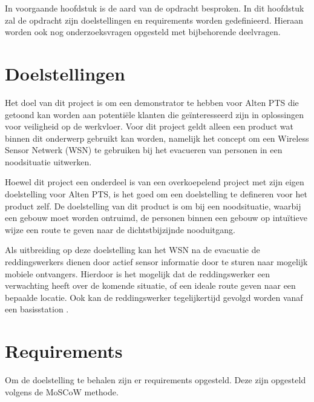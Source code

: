\documentclass{../local}
\begin{document}
In voorgaande hoofdstuk is de aard van de opdracht besproken. In dit hoofdstuk zal de opdracht zijn doelstellingen en requirements worden gedefinieerd. Hieraan worden ook nog onderzoeksvragen opgesteld met bijbehorende deelvragen.

\section{Doelstellingen}
Het doel van dit project is om een demonstrator te hebben voor Alten PTS die getoond kan worden aan potentiële klanten die geïnteresseerd zijn in oplossingen voor veiligheid op de werkvloer. Voor dit project geldt alleen een product wat binnen dit onderwerp gebruikt kan worden, namelijk het concept om een Wireless Sensor Netwerk (WSN) te gebruiken bij het evacueren van personen in een noodsituatie uitwerken.

Hoewel dit project een onderdeel is van een overkoepelend project met zijn eigen doelstelling voor Alten PTS, is het goed om een doelstelling te defineren voor het product zelf. De doelstelling van dit product is om bij een noodsituatie, waarbij een gebouw moet worden ontruimd, de personen binnen een gebouw op intuïtieve wijze een route te geven naar de dichtstbijzijnde nooduitgang. 

Als uitbreiding op deze doelstelling kan het WSN na de evacuatie de reddingswerkers dienen door actief sensor informatie door te sturen naar mogelijk mobiele ontvangers. Hierdoor is het mogelijk dat de reddingswerker een verwachting heeft over de komende situatie, of een ideale route geven naar een bepaalde locatie. Ook kan de reddingswerker tegelijkertijd gevolgd worden vanaf een basisstation \cite{ShaWSN}.

\section{Requirements}
Om de doelstelling te behalen zijn er requirements opgesteld. Deze zijn opgesteld volgens de MoSCoW methode. 
\\\\
\end{document}
